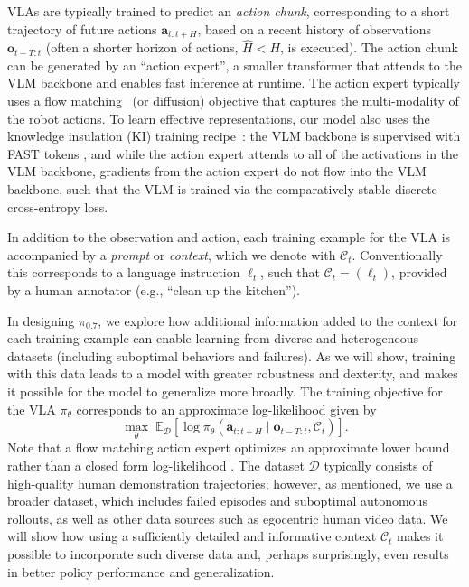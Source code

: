 \documentclass[conference]{IEEEtran}
\newcommand{\ba}{\mathbf{a}}
\newcommand{\bo}{\mathbf{o}}
\newcommand{\E}{\mathbb{E}}
\newcommand{\lang}{\ell}
\newcommand{\data}{\mathcal{D}}
\def \MethodName {$\pi_{0.7}$}
\begin{document}
VLAs are typically trained to predict an \emph{action chunk}, corresponding to a short trajectory of future actions $\ba_{t:t+H}$, based on a recent history of observations $\bo_{t-T:t}$ (often a shorter horizon of actions, $\hat{H} < H$, is executed).
The action chunk can be generated by an ``action expert'', a smaller transformer that attends to the VLM backbone and enables fast inference at runtime. The action expert typically uses a flow matching~\citep{lipman2022flow} (or diffusion) objective that captures the multi-modality of the robot actions. To learn effective representations, our model also uses the knowledge insulation (KI) training recipe~\cite{driess2025knowledge}: the VLM backbone is supervised with FAST tokens \cite{pertsch2025fast}, and while the action expert attends to all of the activations in the VLM backbone, gradients from the action expert do not flow into the VLM backbone, such that the VLM is trained via the comparatively stable discrete cross-entropy loss.

In addition to the observation and action, each training example for the VLA is accompanied by 
a \emph{prompt} or 
\emph{context}, which we denote with $\mathcal{C}_t$. Conventionally this corresponds to a language instruction $\lang_t$, such that $\mathcal{C}_t = (\lang_t)$, provided by a human annotator (e.g., ``clean up the kitchen'').

In designing \MethodName{}, we explore how additional information added to the context for each training example can enable learning from diverse and heterogeneous datasets (including suboptimal behaviors and failures). As we will show, training with this data leads to a model with greater robustness and dexterity, and makes it possible for the model to generalize more broadly. The training objective for the VLA $\pi_\theta$ corresponds to an approximate log-likelihood given by
\begin{equation}
\max_{\theta} \; \E_{\data}
\left[\log \pi_{\theta}(\ba_{t:t+H} \mid \bo_{t-T:t}, \mathcal{C}_t)\right].
\label{eq:vla_il}
\end{equation}
Note that a flow matching action expert optimizes an approximate lower bound rather than a closed form log-likelihood \cite{black2024pi_0}. The dataset $\data$ typically consists of high-quality human demonstration trajectories; however, as mentioned, we use a broader dataset, which includes failed episodes and suboptimal autonomous rollouts, as well as other data sources such as egocentric human video data. We will show how using a sufficiently detailed and informative context $\mathcal{C}_t$ makes it possible to incorporate such diverse data and, perhaps surprisingly, even results in better policy performance and generalization.
\end{document}

